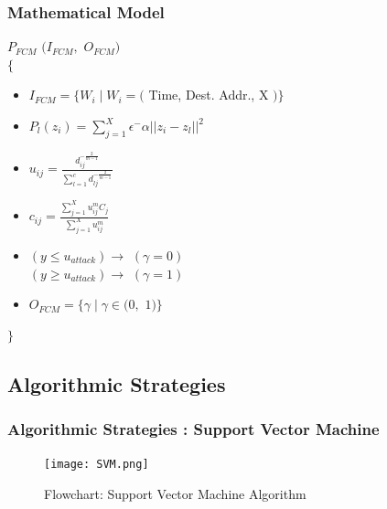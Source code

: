\documentclass[10pt]{beamer}
\begin{document}
\begin{frame}
\frametitle{Mathematical Model}
\footnotesize
$P_{FCM} $ $ (I_{FCM},$ $O_{FCM})$\\
$\lbrace$
\indent
\begin{itemize}
\footnotesize
\item $I_{FCM} = \lbrace W_{i} \mid W_{i} = ($ Time, Dest. Addr., X $) \rbrace$

\item $P_{l}(z_{i}) = \sum_{j=1}^{X}  \epsilon ^ -{ \alpha || z_{i} - z_{l} ||}^{2} $ 

\item $ u_{ij} = \frac{d_{ij}^{-\frac{2}{m-1}}}{\sum_{l=1}^{c} d_{lj}^{- \frac{2}{m-1}}} $

\item $ c_{ij} = \frac{\sum_{j=1}^{X} u_{ij}^{m}C_{j}}{\sum_{j=1}^{X} u_{ij}^{m}} $

\item $(y \leq u_{attack}) \rightarrow  $ $ (\gamma = 0)$ \\ $(y \geq u_{attack}) \rightarrow  $ $ (\gamma = 1)$

\item $ O_{FCM} = \lbrace \gamma \mid \gamma \in (0, $ $1) \rbrace$
\end{itemize}
$ \rbrace$

\end{frame}


\begin{frame}
\section[]{Algorithmic Strategies}
\frametitle{Algorithmic Strategies : Support Vector Machine}
\begin{figure}
\texttt{[image: SVM.png]}
\caption{\footnotesize Flowchart: Support Vector Machine Algorithm}
\end{figure}
\end{frame}
\end{document}
